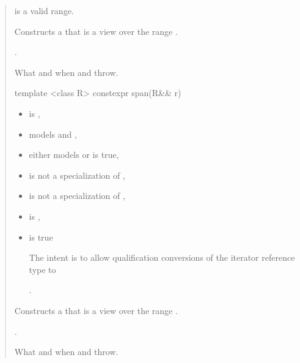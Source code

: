 \documentclass{wg21}
\begin{document}
\begin{quote}
\begin{removedblock}
\begin{itemdescr}
\pnum
\expects
{} is a valid range.

\pnum
\effects
Constructs a  that is a view over the range .

\pnum
\ensures
{}.

\pnum
\throws
What and when  and  throw.
\end{itemdescr}
\end{removedblock}


\begin{addedblock}
\begin{itemdecl}
template <class R>
constexpr span(R&& r)
\end{itemdecl}
\end{addedblock}

\begin{addedblock}
\begin{itemdescr}
    \pnum
    \constraints
    \begin{itemize}
       \item {} is ,
       \item {} models  and ,
       \item either  models  or  is true,
       \item {} is not a specialization of ,
       \item {} is not a specialization of ,
       \item {} is ,
       \item {} is true
       \begin{note}The intent is to allow qualification conversions of the iterator reference type to  \end{note}.
    \end{itemize}


    \pnum
    \effects
    Constructs a  that is a view over the range .

    \pnum
    \ensures
    .

    \pnum
    \throws
    What and when  and  throw.


\end{itemdescr}
\end{addedblock}
\end{quote}
\end{document}
